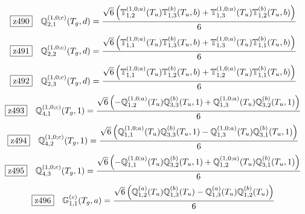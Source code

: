 \documentclass[fleqn,10pt,landscape]{jsarticle}
\begin{document}
\begin{dmath*}
\hspace*{3mm}\fbox{z490}\quad \mathbb{Q}_{2,1}^{(1,0;c)}(T_{g},d)=\frac{\sqrt{6} \left(\mathbb{T}_{1,2}^{(1,0;a)}(T_{u}) \mathbb{T}_{1,3}^{(b)}(T_{u},b) + \mathbb{T}_{1,3}^{(1,0;a)}(T_{u}) \mathbb{T}_{1,2}^{(b)}(T_{u},b)\right)}{6}
\end{dmath*}
\begin{dmath*}
\hspace*{3mm}\fbox{z491}\quad \mathbb{Q}_{2,2}^{(1,0;c)}(T_{g},d)=\frac{\sqrt{6} \left(\mathbb{T}_{1,1}^{(1,0;a)}(T_{u}) \mathbb{T}_{1,3}^{(b)}(T_{u},b) + \mathbb{T}_{1,3}^{(1,0;a)}(T_{u}) \mathbb{T}_{1,1}^{(b)}(T_{u},b)\right)}{6}
\end{dmath*}
\begin{dmath*}
\hspace*{3mm}\fbox{z492}\quad \mathbb{Q}_{2,3}^{(1,0;c)}(T_{g},d)=\frac{\sqrt{6} \left(\mathbb{T}_{1,1}^{(1,0;a)}(T_{u}) \mathbb{T}_{1,2}^{(b)}(T_{u},b) + \mathbb{T}_{1,2}^{(1,0;a)}(T_{u}) \mathbb{T}_{1,1}^{(b)}(T_{u},b)\right)}{6}
\end{dmath*}
\begin{dmath*}
\hspace*{3mm}\fbox{z493}\quad \mathbb{Q}_{4,1}^{(1,0;c)}(T_{g},1)=\frac{\sqrt{6} \left(- \mathbb{Q}_{1,2}^{(1,0;a)}(T_{u}) \mathbb{Q}_{3,3}^{(b)}(T_{u},1) + \mathbb{Q}_{1,3}^{(1,0;a)}(T_{u}) \mathbb{Q}_{3,2}^{(b)}(T_{u},1)\right)}{6}
\end{dmath*}
\begin{dmath*}
\hspace*{3mm}\fbox{z494}\quad \mathbb{Q}_{4,2}^{(1,0;c)}(T_{g},1)=\frac{\sqrt{6} \left(\mathbb{Q}_{1,1}^{(1,0;a)}(T_{u}) \mathbb{Q}_{3,3}^{(b)}(T_{u},1) - \mathbb{Q}_{1,3}^{(1,0;a)}(T_{u}) \mathbb{Q}_{3,1}^{(b)}(T_{u},1)\right)}{6}
\end{dmath*}
\begin{dmath*}
\hspace*{3mm}\fbox{z495}\quad \mathbb{Q}_{4,3}^{(1,0;c)}(T_{g},1)=\frac{\sqrt{6} \left(- \mathbb{Q}_{1,1}^{(1,0;a)}(T_{u}) \mathbb{Q}_{3,2}^{(b)}(T_{u},1) + \mathbb{Q}_{1,2}^{(1,0;a)}(T_{u}) \mathbb{Q}_{3,1}^{(b)}(T_{u},1)\right)}{6}
\end{dmath*}
\begin{dmath*}
\hspace*{3mm}\fbox{z496}\quad \mathbb{G}_{1,1}^{(c)}(T_{g},a)=\frac{\sqrt{6} \left(\mathbb{Q}_{1,2}^{(a)}(T_{u}) \mathbb{Q}_{1,3}^{(b)}(T_{u}) - \mathbb{Q}_{1,3}^{(a)}(T_{u}) \mathbb{Q}_{1,2}^{(b)}(T_{u})\right)}{6}
\end{dmath*}
\end{document}
